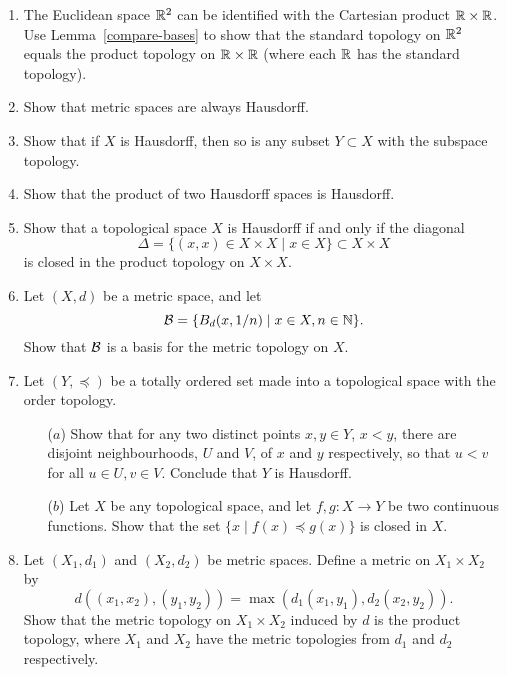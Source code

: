 \begin{enumerate}[label=1.\arabic*]
  \item \label{product-topology-is-standard} The Euclidean space $\mathbb{R}^2$ can be identified with the Cartesian product $\mathbb{R} \times \mathbb{R}$. Use Lemma~\ref{compare-bases} to show that the standard topology on $\mathbb{R}^2$ equals the product topology on $\mathbb{R} \times \mathbb{R}$ (where each $\mathbb{R}$ has the standard topology).
  

  \item \label{metric-Hausdorff} Show that metric spaces are always Hausdorff.
  
  \item \label{subspace-Hausdorff} Show that if $X$ is Hausdorff, then so is any subset $Y\subset X$ with the subspace topology.
  
  \item \label{products-Hausdorff} Show that the product of two Hausdorff spaces is Hausdorff.
  
  \item Show that a topological space $X$ is Hausdorff if and only if the diagonal
  \[
    \Delta = \{(x,x) \in X \times X \mid x \in X \} \subset X \times X
  \]
  is closed in the product topology on $X \times X$.
  
  \item \label{metric-first-countable} Let $(X,d)$ be a metric space, and let
  \[
    \mathcal{B} = \{ B_d(x,1/n) \mid x \in X, n \in \mathbb{N} \}.
  \]
  Show that $\mathcal{B}$ is a basis for the metric topology on $X$.
  
  \item Let $(Y,\preceq)$ be a totally ordered set made into a topological space with the order topology.
  \begin{itemize}
    \item[($a$)] Show that for any two distinct points $x, y \in Y$, $x < y$, there are disjoint neighbourhoods, $U$ and $V$, of $x$ and $y$ respectively, so that $u < v$ for all $u \in U, v \in V$. Conclude that $Y$ is Hausdorff.
    \item[($b$)] Let $X$ be any topological space, and let $f,g:X\to Y$ be two continuous functions. Show that the set $\{x \mid f(x)\preceq g(x)\}$ is closed in $X$.
  \end{itemize}
  
  \item \label{product-metric}Let $(X_1,d_1)$ and $(X_2,d_2)$ be metric spaces. Define a metric on $X_1 \times X_2$ by
	\[
	  d((x_1,x_2),(y_1,y_2)) = \max(d_1(x_1,y_1),d_2(x_2,y_2)).
  \]
  Show that the metric topology on $X_1 \times X_2$ induced by $d$ is the product topology, where $X_1$ and $X_2$ have the metric topologies from $d_1$ and $d_2$ respectively.


\end{enumerate}
